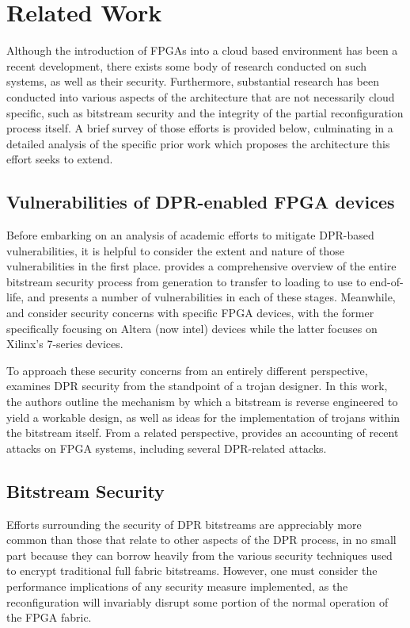 
\chapter{Related Work}\label{ch:relatedWork}
Although the introduction of FPGAs into a cloud based environment has been a recent development, there exists some body of research conducted on such systems, as well as their security. Furthermore, substantial research has been conducted into various aspects of the architecture that are not necessarily cloud specific, such as bitstream security and the integrity of the partial reconfiguration process itself. A brief survey of those efforts is provided below, culminating in a detailed analysis of the specific prior work which proposes the architecture this effort seeks to extend.

\section{Vulnerabilities of DPR-enabled FPGA devices} \label{sec:vulnerabilities}
Before embarking on an analysis of academic efforts to mitigate DPR-based vulnerabilities, it is helpful to consider the extent and nature of those vulnerabilities in the first place. \cite{duncan_fpga_2019} provides a comprehensive overview of the entire bitstream security process from generation to transfer to loading to use to end-of-life, and presents a number of vulnerabilities in each of these stages. Meanwhile, \cite{swierczynski_physical_2014} and \cite{ender_unpatchable_2020} consider security concerns with specific FPGA devices, with the former specifically focusing on Altera (now intel) devices while the latter focuses on Xilinx's 7-series devices.

To approach these security concerns from an entirely different perspective, \cite{ender_insights_2019} examines DPR security from the standpoint of a trojan designer. In this work, the authors outline the mechanism by which a bitstream is reverse engineered to yield a workable design, as well as ideas for the implementation of trojans within the bitstream itself. From a related perspective, \cite{zhang_recent_2019} provides an accounting of recent attacks on FPGA systems, including several DPR-related attacks.

\section{Bitstream Security} \label{sec:bitstreamSecurity}
Efforts surrounding the security of DPR bitstreams are appreciably more common than those that relate to other aspects of the DPR process, in no small part because they can borrow heavily from the various security techniques used to encrypt traditional full fabric bitstreams. However, one must consider the performance implications of any security measure implemented, as the reconfiguration will invariably disrupt some portion of the normal operation of the FPGA fabric.

